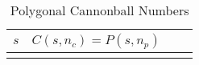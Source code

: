 \begin{longtable}{*4r}
\toprule
\boldmath \(s\) & \boldmath \(C(s, n_c) = P(s, n_p)\) \\
\midrule
\endhead

\bottomrule
\caption{Polygonal Cannonball Numbers}
\end{longtable}
